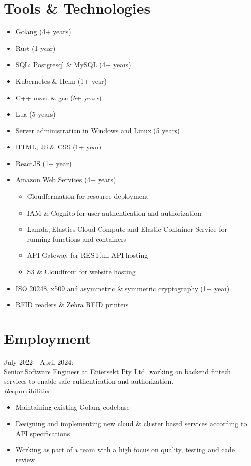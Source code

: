 \documentclass[11pt,a4paper]{article}
\begin{document}
\section*{Tools \& Technologies}
\begin{itemize}
	\item Golang (4+ years)
	\item Rust (1 year)
	\item SQL: Postgresql \& MySQL  (4+ years)
	\item Kubernetes \& Helm (1+ year)
	\item C++ msvc \& gcc (5+ years)
	\item Lua (5 years)
	\item Server administration in Windows and Linux (5 years)
	\item HTML, JS \& CSS (1+ year)
	\item ReactJS (1+ year)
	\item Amazon Web Services (4+ years)
	\begin{itemize}
		\item Cloudformation for resource deployment
		\item IAM \& Cognito for user authentication and authorization
		\item Lamda, Elastics Cloud Compute and Elastic Container Service for running functions and containers
		\item API Gateway for RESTfull API hosting
		\item S3 \& Cloudfront for website hosting 
	\end{itemize}
	\item ISO 20248, x509 and asymmetric \& symmetric cryptography (1+ year)
	\item RFID readers \& Zebra RFID printers
\end{itemize}

\section*{Employment}        
   
{\noindent\large July 2022 - April 2024:}\\
Senior Software Engineer at Entersekt Pty Ltd. working on backend fintech services to enable safe authentication and authorization.
\\

	{\emph Responsibilities}
	\begin{itemize}
		\item   Maintaining existing Golang codebase
		\item   Designing and implementing new cloud \& cluster based services according to API specifications
		\item   Working as part of a team with a high focus on quality, testing and code review  
	\end{itemize}
     
\end{document}
